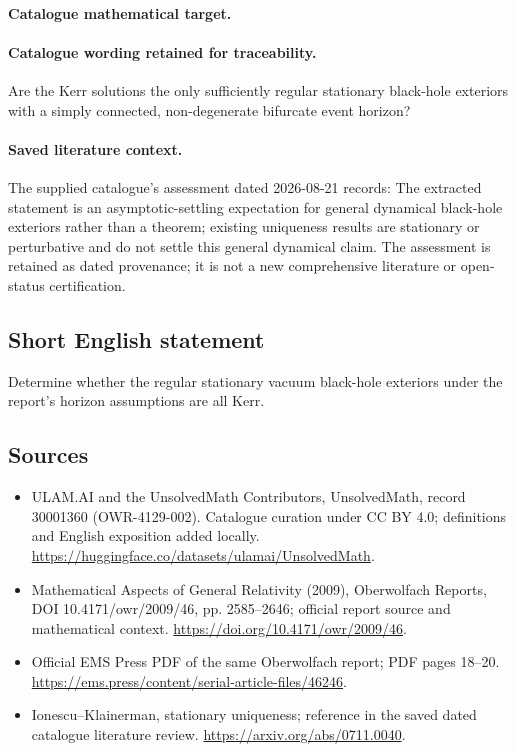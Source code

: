 \documentclass[11pt]{article}
\begin{document}
\paragraph{Catalogue mathematical target.}
\paragraph{Catalogue wording retained for traceability.}
Are the Kerr solutions the only sufficiently regular stationary black-hole exteriors with a simply connected, non-degenerate bifurcate event horizon?

\paragraph{Saved literature context.} The supplied catalogue's assessment dated 2026-08-21 records: The extracted statement is an asymptotic-settling expectation for general dynamical black-hole exteriors rather than a theorem; existing uniqueness results are stationary or perturbative and do not settle this general dynamical claim. The assessment is retained as dated provenance; it is not a new comprehensive literature or open-status certification.
\subsection{Short English statement}
Determine whether the regular stationary vacuum black-hole exteriors under the report's horizon assumptions are all Kerr.
\subsection{Sources}
\begin{itemize}
\item[\hypertarget{source:30001360:1}{S1}] ULAM.AI and the UnsolvedMath Contributors, UnsolvedMath, record 30001360 (OWR-4129-002). Catalogue curation under CC BY 4.0; definitions and English exposition added locally.
\url{https://huggingface.co/datasets/ulamai/UnsolvedMath}.
\item[\hypertarget{source:30001360:2}{S2}] Mathematical Aspects of General Relativity (2009), Oberwolfach Reports, DOI 10.4171/owr/2009/46, pp. 2585--2646; official report source and mathematical context.
\url{https://doi.org/10.4171/owr/2009/46}.
\item[\hypertarget{source:30001360:3}{S3}] Official EMS Press PDF of the same Oberwolfach report; PDF pages 18--20.
\url{https://ems.press/content/serial-article-files/46246}.
\item[\hypertarget{source:30001360:4}{S4}] Ionescu--Klainerman, stationary uniqueness; reference in the saved dated catalogue literature review.
\url{https://arxiv.org/abs/0711.0040}.
\end{itemize}
\label{end:30001360}
\end{document}
